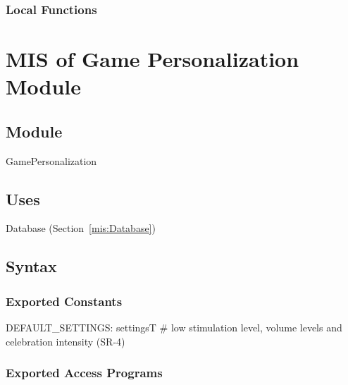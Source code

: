 \documentclass[12pt, titlepage]{article}
\newcommand{\Mref}[1]{Section~\ref{#1}}
\begin{document}
\subsubsection{Local Functions}

\newpage

\section{MIS of Game Personalization Module} \label{mis:GamePersonalization}

\subsection{Module}

GamePersonalization

\subsection{Uses}

Database (\Mref{mis:Database})

\subsection{Syntax}

\subsubsection{Exported Constants}

DEFAULT\_SETTINGS: settingsT \# low stimulation level, volume levels and
celebration intensity (SR-4)

\subsubsection{Exported Access Programs}
\end{document}
